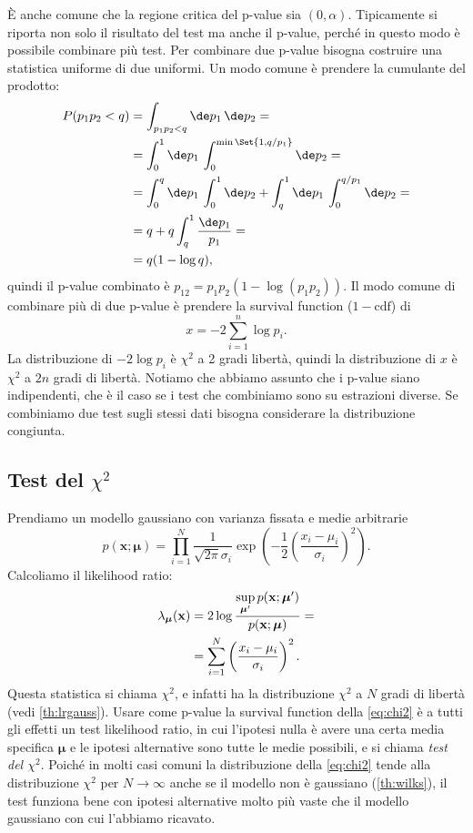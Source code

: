\noindent È anche comune che la regione critica del p-value sia $(0,\alpha)$.
Tipicamente si riporta non solo il risultato del test ma anche il p-value,
perché in questo modo è possibile combinare più test.
Per combinare due p-value bisogna costruire una statistica uniforme di due uniformi.
Un modo comune è prendere la cumulante del prodotto:
\begin{align*}
	P(p_1p_2<q)
	&= \int_{p_1p_2<q}\de p_1\,\de p_2 = \\
	&= \int_0^1\de p_1\, \int_0^{\min\Set{1,q/p_1}} \de p_2 = \\
	&= \int_0^q\de p_1\, \int_0^1 \de p_2
	+ \int_q^1 \de p_1\, \int_0^{q/p_1} \de p_2 = \\
	&= q + q\int_q^1 \frac{\de p_1}{p_1} = \\
	&= q(1-\log q),
\end{align*}
quindi il p-value combinato è $p_{12} = p_1p_2(1-\log(p_1p_2))$.
Il modo comune di combinare più di due p-value è prendere la survival function ($1-\text{cdf}$) di
\begin{equation*}
	x = -2 \sum_{i=1}^n \log p_i.
\end{equation*}
La distribuzione di $-2\log p_i$ è $\chi^2$ a 2 gradi libertà,
quindi la distribuzione di $x$ è $\chi^2$ a $2n$ gradi di libertà.
Notiamo che abbiamo assunto che i p-value siano indipendenti,
che è il caso se i test che combiniamo sono su estrazioni diverse.
Se combiniamo due test sugli stessi dati
bisogna considerare la distribuzione congiunta.

\subsection{Test del $\chi^2$}

Prendiamo un modello gaussiano con varianza fissata e medie arbitrarie
\begin{equation*}
	p(\mathbf x;\boldsymbol\mu)
	= \prod_{i=1}^N \frac1{\sqrt{2\pi}\sigma_i}
	\exp\left(-\frac12\left(\frac{x_i-\mu_i}{\sigma_i}\right)^2\right).
\end{equation*}
Calcoliamo il likelihood ratio:
\begin{align}
	\lambda_{\boldsymbol\mu}(\mathbf x)
	&= 2\log \frac
	{\sup\limits_{\boldsymbol\mu'} p(\mathbf x;\boldsymbol\mu')}
	{p(\mathbf x;\boldsymbol\mu)} = \notag \\
	&= \sum_{i=1}^N \left(\frac{x_i-\mu_i}{\sigma_i}\right)^2. \label{eq:chi2}
\end{align}
Questa statistica si chiama $\chi^2$,
e infatti ha la distribuzione $\chi^2$ a $N$ gradi di libertà (vedi \autoref{th:lrgauss}).
Usare come p-value la survival function della \eqref{eq:chi2}
è a tutti gli effetti un test likelihood ratio, in cui l'ipotesi nulla
è avere una certa media specifica $\boldsymbol\mu$ e le ipotesi alternative
sono tutte le medie possibili,
e si chiama \emph{test del $\chi^2$}.
Poiché in molti casi comuni la distribuzione della \eqref{eq:chi2} tende alla distribuzione $\chi^2$
per $N\to\infty$ anche se il modello non è gaussiano (\autoref{th:wilks}),
il test funziona bene con ipotesi alternative molto più vaste che il modello gaussiano con cui l'abbiamo ricavato.

